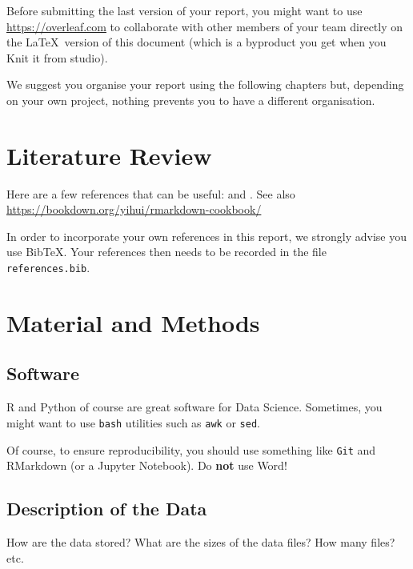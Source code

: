 \documentclass[mstat,12pt]{unswthesis}
\begin{document}
\bigskip

Before submitting the last version of your report, you might want to use
\url{https://overleaf.com} to collaborate with other members of your
team directly on the \LaTeX~version of this document (which is a
byproduct you get when you Knit it from studio).

\bigskip

We suggest you organise your report using the following chapters but,
depending on your own project, nothing prevents you to have a different
organisation.

\hypertarget{literature-review}{%
\chapter{Literature Review}\label{literature-review}}

Here are a few references that can be useful: \cite{Xie2018} and
\cite{Lafaye2013}. See also
\url{https://bookdown.org/yihui/rmarkdown-cookbook/}

\bigskip

In order to incorporate your own references in this report, we strongly
advise you use BibTeX. Your references then needs to be recorded in the
file \texttt{references.bib}.

\hypertarget{material-and-methods}{%
\chapter{Material and Methods}\label{material-and-methods}}

\hypertarget{software}{%
\section{Software}\label{software}}

R and Python of course are great software for Data Science. Sometimes,
you might want to use \texttt{bash} utilities such as \texttt{awk} or
\texttt{sed}.

Of course, to ensure reproducibility, you should use something like
\texttt{Git} and RMarkdown (or a Jupyter Notebook). Do \textbf{not} use
Word!

\hypertarget{description-of-the-data}{%
\section{Description of the Data}\label{description-of-the-data}}

How are the data stored? What are the sizes of the data files? How many
files? etc.
\end{document}
